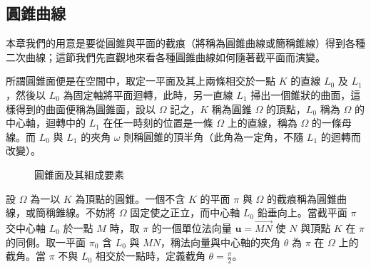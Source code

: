 \subsection{圓錐曲線}
\label{sec:b4s-2-3}

本章我們的用意是要從圓錐與平面的截痕（將稱為圓錐曲線或簡稱錐線）得到各種二次曲線；這節我們先直觀地來看各種圓錐曲線如何隨著截平面而演變。

\begin{definition}[定義]
所謂圓錐面便是在空間中，取定一平面及其上兩條相交於一點 $K$ 的直線 $L_0$ 及 $L_1$，然後以 $L_0$ 為固定軸將平面迴轉，此時，另一直線 $L_1$ 掃出一個錐狀的曲面，這樣得到的曲面便稱為圓錐面，設以 $\Omega$ 記之，$K$ 稱為圓錐 $\Omega$ 的頂點，$L_0$ 稱為 $\Omega$ 的中心軸，迴轉中的 $L_1$ 在任一時刻的位置是一條 $\Omega$ 上的直線，稱為 $\Omega$ 的一條母線。而 $L_0$ 與 $L_1$ 的夾角 $\omega$ 則稱圓錐的頂半角（此角為一定角，不隨 $L_1$ 的迴轉而改變）。
\end{definition}

\begin{figure}[H]
\centering
{}
\caption{圓錐面及其組成要素}
\label{fig:b4s-2-3-1}
\end{figure}

\begin{definition}[定義]
設 $\Omega$ 為一以 $K$ 為頂點的圓錐。一個不含 $K$ 的平面 $\pi$ 與 $\Omega$ 的截痕稱為圓錐曲線，或簡稱錐線。不妨將 $\Omega$ 固定使之正立，而中心軸 $L_0$ 鉛垂向上。當截平面 $\pi$ 交中心軸 $L_0$ 於一點 $M$ 時，取 $\pi$ 的一個單位法向量 $\mathbf{u} = \vec{MN}$ 使 $N$ 與頂點 $K$ 在 $\pi$ 的同側。取一平面 $\pi_0$ 含 $L_0$ 與 $MN$，稱法向量與中心軸的夾角 $\theta$ 為 $\pi$ 在 $\Omega$ 上的截角。當 $\pi$ 不與 $L_0$ 相交於一點時，定義截角 $\theta = \frac{\pi}{2}$。
\end{definition}

